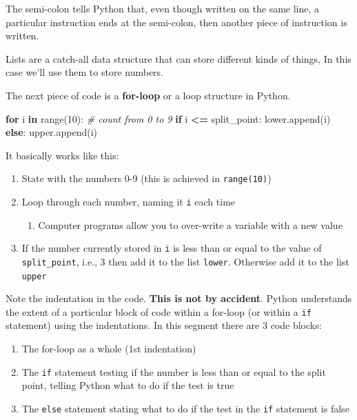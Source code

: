 \documentclass[
  letterpaper,
]{scrbook}
\newenvironment{Shaded}{\begin{snugshade}}{\end{snugshade}}
\newcommand{\BuiltInTok}[1]{#1}
\newcommand{\CommentTok}[1]{\textcolor[rgb]{0.56,0.35,0.01}{\textit{#1}}}
\newcommand{\ControlFlowTok}[1]{\textcolor[rgb]{0.13,0.29,0.53}{\textbf{#1}}}
\newcommand{\DecValTok}[1]{\textcolor[rgb]{0.00,0.00,0.81}{#1}}
\newcommand{\KeywordTok}[1]{\textcolor[rgb]{0.13,0.29,0.53}{\textbf{#1}}}
\newcommand{\NormalTok}[1]{#1}
\newcommand{\OperatorTok}[1]{\textcolor[rgb]{0.81,0.36,0.00}{\textbf{#1}}}
\providecommand{\tightlist}{%
  \setlength{\itemsep}{0pt}\setlength{\parskip}{0pt}}
\begin{document}
The semi-colon tells Python that, even though written on the same line, a particular instruction ends at the semi-colon, then another piece of instruction is written.

Lists are a catch-all data structure that can store different kinds of things, In this case we'll use them to store numbers.

The next piece of code is a \textbf{for-loop} or a loop structure in Python.

\begin{Shaded}
\begin{Highlighting}[]
\ControlFlowTok{for}\NormalTok{ i }\KeywordTok{in} \BuiltInTok{range}\NormalTok{(}\DecValTok{10}\NormalTok{):  }\CommentTok{# count from 0 to 9}
    \ControlFlowTok{if}\NormalTok{ i }\OperatorTok{<=}\NormalTok{ split_point:}
\NormalTok{        lower.append(i)}
    \ControlFlowTok{else}\NormalTok{:}
\NormalTok{        upper.append(i)}
\end{Highlighting}
\end{Shaded}

It basically works like this:

\begin{enumerate}
\def\labelenumi{\arabic{enumi}.}
\tightlist
\item
  State with the numbers 0-9 (this is achieved in \texttt{range(10)})
\item
  Loop through each number, naming it \texttt{i} each time

  \begin{enumerate}
  \def\labelenumii{\arabic{enumii}.}
  \tightlist
  \item
    Computer programs allow you to over-write a variable with a new value
  \end{enumerate}
\item
  If the number currently stored in \texttt{i} is less than or equal to the value of \texttt{split\_point}, i.e., 3 then add it to the list \texttt{lower}. Otherwise add it to the list \texttt{upper}
\end{enumerate}

Note the indentation in the code. \textbf{This is not by accident}. Python understands the extent of a particular block of code within a for-loop (or within a \texttt{if} statement) using the indentations. In this segment there are 3 code blocks:

\begin{enumerate}
\def\labelenumi{\arabic{enumi}.}
\tightlist
\item
  The for-loop as a whole (1st indentation)
\item
  The \texttt{if} statement testing if the number is less than or equal to the split point, telling Python what to do if the test is true
\item
  The \texttt{else} statement stating what to do if the test in the \texttt{if} statement is false
\end{enumerate}
\end{document}
